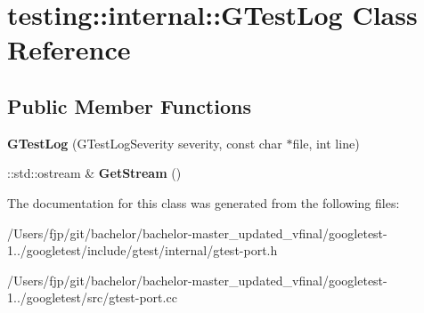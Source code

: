 \hypertarget{classtesting_1_1internal_1_1_g_test_log}{}\section{testing\+:\+:internal\+:\+:G\+Test\+Log Class Reference}
\label{classtesting_1_1internal_1_1_g_test_log}
\subsection*{Public Member Functions}
\begin{DoxyCompactItemize}
\item 
\mbox{\label{classtesting_1_1internal_1_1_g_test_log_a364691bf972983a59cfa2891062a64af}} 
{\bfseries G\+Test\+Log} (G\+Test\+Log\+Severity severity, const char $\ast$file, int line)
\item 
\mbox{\label{classtesting_1_1internal_1_1_g_test_log_aebb92e67d98eca69f0347d5121dab27a}} 
\+::std\+::ostream \& {\bfseries Get\+Stream} ()
\end{DoxyCompactItemize}


The documentation for this class was generated from the following files\+:\begin{DoxyCompactItemize}
\item 
/\+Users/fjp/git/bachelor/bachelor-\/master\+\_\+updated\+\_\+vfinal/googletest-\/1../googletest/include/gtest/internal/gtest-\/port.\+h\item 
/\+Users/fjp/git/bachelor/bachelor-\/master\+\_\+updated\+\_\+vfinal/googletest-\/1../googletest/src/gtest-\/port.\+cc\end{DoxyCompactItemize}
